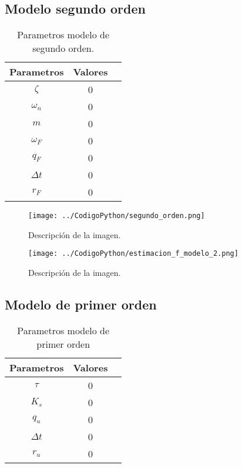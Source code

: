 \documentclass[conference]{IEEEtran}
\begin{document}
\subsection{Modelo segundo orden}

\begin{table}[h]
	\centering
	\caption{Parametros modelo de segundo orden.}
	\label{tab:parametros_segundo_orden}
	\begin{tabular}{|c|c|c|}
		\hline
		\textbf{Parametros} & \textbf{Valores} \\
		\hline
		$\zeta$  &  0 \\
		$\omega_n$      & 0 \\
		$m$ & 0 \\
		$\omega_F$ & 0 \\
		$ q_F $  &  0\\
		$\Delta t$ & 0\\  
		$r_F$ & 0 \\ 
		\hline
	\end{tabular}
	
\end{table}




\begin{figure}[h]
	\centering
	\texttt{[image: ../CodigoPython/segundo\_orden.png]}
	\caption{Descripción de la imagen.}
	\label{fig:etiqueta}
\end{figure}

\begin{figure}[h]
	\centering
	\texttt{[image: ../CodigoPython/estimacion\_f\_modelo\_2.png]}
	\caption{Descripción de la imagen.}
	\label{fig:etiqueta}
\end{figure}


\subsection{Modelo de primer orden}

\begin{table}[h]
	\centering
	\caption{Parametros modelo de primer orden}
	\label{tab:parametros_primer_orden}
	\begin{tabular}{|c|c|c|}
		\hline
		\textbf{Parametros} & \textbf{Valores} \\
		\hline
		$\tau$  &  0 \\
		$K_s$      & 0 \\
		$q_u$ & 0 \\
		$\Delta t$ & 0\\  
		$r_u$ & 0 \\ 
		\hline
	\end{tabular}
	
\end{table}
\end{document}
